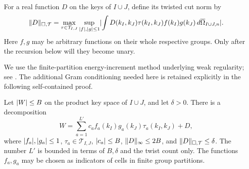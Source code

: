 For a real function $D$ on the keys of $I\cup J$, define its twisted
cut norm by
\begin{equation}\label{eq:twisted-cut-norm}
 \lVert D\rVert_{\square,\mathcal T}
 =\max_{\tau\in\mathcal T_{I,J}}
   \sup_{\lvert f\rvert,\lvert g\rvert\le1}
   \lvert \int D(k_I,k_J)\tau(k_I,k_J)f(k_I)g(k_J)
                  \,d\overline\Omega_{I\cup J,n}\rvert.
\end{equation}
Here $f,g$ may be arbitrary functions on their whole respective
groups. Only after the recursion below will they become unary.

We use the finite-partition energy-increment method underlying weak
regularity; see \citet{frieze1999}. The additional Gram conditioning
needed here is retained explicitly in the following self-contained proof.

\begin{lemma}
\label{lem:product-twisted-regularity}
Let $\lvert W\rvert\le B$ on the product key space of $I\cup J$, and let
$\delta>0$. There is a decomposition
\begin{equation}\label{eq:twisted-regularity-decomposition}
 W=\sum_{a=1}^{L'}c_a f_a(k_I)g_a(k_J)\tau_a(k_I,k_J)+D,
\end{equation}
where $\lvert f_a\rvert,\lvert g_a\rvert\le1$, $\tau_a\in\mathcal T_{I,J}$,
$\lvert c_a\rvert\le B$, $\lVert D\rVert_\infty\le2B$, and
$\lVert D\rVert_{\square,\mathcal T}\le\delta$. The number $L'$ is bounded
in terms of $B,\delta$ and the twist count only. The functions $f_a,g_a$
may be chosen as indicators of cells in finite group partitions.
\end{lemma}

